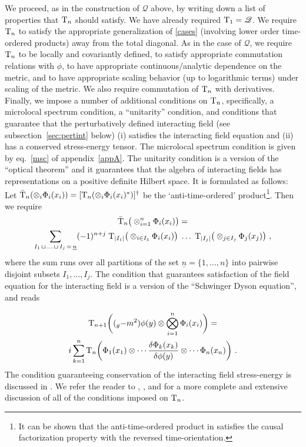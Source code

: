 \documentclass[12pt]{article}
\newcommand{\eQ}{\mathscr{Q}}
\renewcommand{\O}{\Phi}
\newcommand{\T}{{\rm T}}
\theoremstyle{plain}
\theoremstyle{definition}
\begin{document}
We proceed, as in the construction of $\eQ$ above, by writing down a list of properties that $\T_n$
should satisfy. We have already required $\T_1 = \eQ$. We require $\T_n$ to satisfy the appropriate generalization
of \eqref{cases} (involving lower order time-ordered products) away from the total diagonal.
As in the case of $\eQ$, we require $\T_n$ to be locally and covariantly defined, to satisfy
appropriate commutation relations with $\phi$, to have appropriate continuous/analytic dependence on the metric, and to have appropriate scaling behavior (up to logarithmic terms) under scaling of the metric. We also require commutation of $\T_n$ with derivatives. Finally, we impose a number of additional conditions on $\T_n$, specifically, a
microlocal spectrum condition, a ``unitarity'' condition,
and conditions that guarantee that the perturbatively defined interacting field (see subsection~\ref{sec:pertint} below) (i) satisfies the
interacting field equation and (ii) has a conserved stress-energy tensor. The microlocal spectrum condition is given by
eq.~\eqref{msc} of appendix~\ref{appA}.
The unitarity condition is a version of the ``optical theorem'' and it
guarantees that the algebra of interacting fields has representations on a positive definite Hilbert space. It is formulated as follows:
Let $\bar \T_n(\otimes_i \O_i(x_i)) =
[\T_n(\otimes_i \O_i(x_i)^*)]^\dagger$ be
the \lq anti-time-ordered' product\footnote{It can be shown that the anti-time-ordered product in satisfies the causal factorization property with the reversed time-orientation.}.
Then we require
\begin{multline}
\bar \T_n \big( \otimes_{i=1}^n \O_i(x_i) \big) = \\
\sum_{I_1 \, \sqcup \, ...\, \sqcup \, I_j \, =\, \underline{n}} (-1)^{n + j} \; \T_{| I_1 |} \big( \otimes_{i \in I_1} \O_i(x_i) \big) \; \dots \; \T_{|I_j|}\big(\otimes_{j \in I_j} \O_j(x_j) \big)~,
\label{atop}
\end{multline}
where the sum runs over all partitions of the set $\underline{n} = \{1, \dots, n\}$ into pairwise disjoint subsets $I_1, ..., I_j$.
The condition that guarantees satisfaction of the field equation for the interacting field is a version of the ``Schwinger Dyson equation'', and reads

\begin{multline}
\label{dyson}
\T_{n+1}\bigg(
(\square_g - m^2) \phi(y) \otimes \bigotimes_{i=1}^n \O_i(x_i)
\bigg)
= \\
i \sum_{k=1}^n
\T_n
\bigg(
\O_1(x_1) \otimes \cdots \frac{\delta \O_k(x_k)}{\delta \phi(y)} \otimes \cdots \O_n(x_n) \bigg) \ .
\end{multline}
The condition guaranteeing conservation of the interacting field stress-energy is discussed in \cite{hw4}. We refer the reader
to \cite{hw1}, \cite{hw2}, and \cite{hw4} for a more complete and extensive discussion of all of the conditions imposed on $\T_n$.
\end{document}

